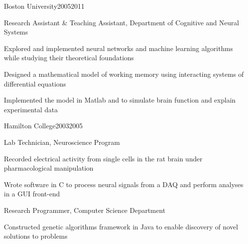 \documentclass{report}
\begin{document}

  \begin{work_location}{Boston University}{2005}{2011}

    \begin{position}{Research Assistant \& Teaching Assistant, Department of Cognitive and Neural Systems}
      \item Explored and implemented neural networks and machine learning algorithms while studying their theoretical foundations
      \item Designed a mathematical model of working memory using interacting systems of differential equations
      \item Implemented the model in Matlab and \CC{} to simulate brain function and explain experimental data
    \end{position}

  \end{work_location}



  \begin{work_location}{Hamilton College}{2003}{2005}

    \begin{position}{Lab Technician, Neuroscience Program}
      \item Recorded electrical activity from single cells in the rat brain under pharmacological manipulation
      \item Wrote software in C to process neural signals from a DAQ and perform analyses in a GUI front-end
    \end{position}

    \begin{position}{Research Programmer, Computer Science Department}
      \item Constructed genetic algorithms framework in Java to enable discovery of novel solutions to problems
    \end{position}

  \end{work_location}




\end{document}
